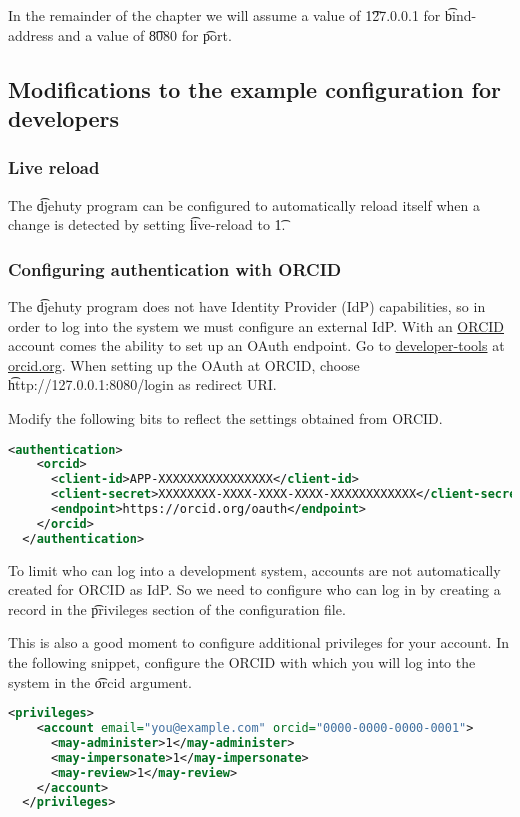 In the remainder of the chapter we will assume a value of \t{127.0.0.1} for
\t{bind-address} and a value of \t{8080} for \t{port}.

\subsection{Modifications to the example configuration for developers}

\subsubsection{Live reload}

The \t{djehuty} program can be configured to automatically reload itself when
a change is detected by setting \t{live-reload} to \t{1}.

\subsubsection{Configuring authentication with ORCID}

The \t{djehuty} program does not have Identity Provider (IdP) capabilities,
so in order to log into the system we must configure an external IdP.  With
an \href{https://orcid.org}{ORCID} account comes the ability to set up an OAuth
endpoint.  Go to \href{https://orcid.org/developer-tools}{developer-tools} at
\href{https://orcid.org}{orcid.org}.  When setting up the OAuth at ORCID,
choose \t{http://127.0.0.1:8080/login} as redirect URI.

Modify the following bits to reflect the settings obtained from ORCID.
\begin{lstlisting}[language=xml]
  <authentication>
    <orcid>
      <client-id>APP-XXXXXXXXXXXXXXXX</client-id>
      <client-secret>XXXXXXXX-XXXX-XXXX-XXXX-XXXXXXXXXXXX</client-secret>
      <endpoint>https://orcid.org/oauth</endpoint>
    </orcid>
  </authentication>
\end{lstlisting}

To limit who can log into a development system, accounts are not automatically
created for ORCID as IdP.  So we need to configure who can log in by creating
a record in the \t{privileges} section of the configuration file.

This is also a good moment to configure additional privileges for your account.
In the following snippet, configure the ORCID with which you will log into
the system in the \t{orcid} argument.

\begin{lstlisting}[language=xml]
  <privileges>
    <account email="you@example.com" orcid="0000-0000-0000-0001">
      <may-administer>1</may-administer>
      <may-impersonate>1</may-impersonate>
      <may-review>1</may-review>
    </account>
  </privileges>
\end{lstlisting}


